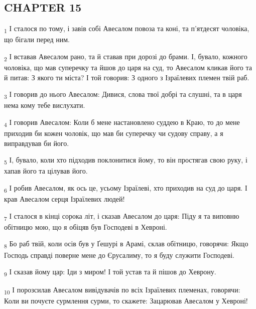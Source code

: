 \subsection{CHAPTER 15}
\begin{tcolorbox}
\textsubscript{1} І сталося по тому, і завів собі Авесалом повоза та коні, та п'ятдесят чоловіка, що бігали перед ним.
\end{tcolorbox}
\begin{tcolorbox}
\textsubscript{2} І вставав Авесалом рано, та й ставав при дорозі до брами. І, бувало, кожного чоловіка, що мав суперечку та йшов до царя на суд, то Авесалом кликав його та й питав: З якого ти міста? І той говорив: З одного з Ізраїлевих племен твій раб.
\end{tcolorbox}
\begin{tcolorbox}
\textsubscript{3} І говорив до нього Авесалом: Дивися, слова твої добрі та слушні, та в царя нема кому тебе вислухати.
\end{tcolorbox}
\begin{tcolorbox}
\textsubscript{4} І говорив Авесалом: Коли б мене настановлено суддею в Краю, то до мене приходив би кожен чоловік, що мав би суперечку чи судову справу, а я виправдував би його.
\end{tcolorbox}
\begin{tcolorbox}
\textsubscript{5} І, бувало, коли хто підходив поклонитися йому, то він простягав свою руку, і хапав його та цілував його.
\end{tcolorbox}
\begin{tcolorbox}
\textsubscript{6} І робив Авесалом, як ось це, усьому Ізраїлеві, хто приходив на суд до царя. І крав Авесалом серця Ізраїлевих людей!
\end{tcolorbox}
\begin{tcolorbox}
\textsubscript{7} І сталося в кінці сорока літ, і сказав Авесалом до царя: Піду я та виповню обітницю мою, що я обіцяв був Господеві в Хевроні.
\end{tcolorbox}
\begin{tcolorbox}
\textsubscript{8} Бо раб твій, коли осів був у Ґешурі в Арамі, склав обітницю, говорячи: Якщо Господь справді поверне мене до Єрусалиму, то я буду служити Господеві.
\end{tcolorbox}
\begin{tcolorbox}
\textsubscript{9} І сказав йому цар: Іди з миром! І той устав та й пішов до Хеврону.
\end{tcolorbox}
\begin{tcolorbox}
\textsubscript{10} І порозсилав Авесалом вивідувачів по всіх Ізраїлевих племенах, говорячи: Коли ви почуєте сурмлення сурми, то скажете: Зацарював Авесалом у Хевроні!
\end{tcolorbox}
